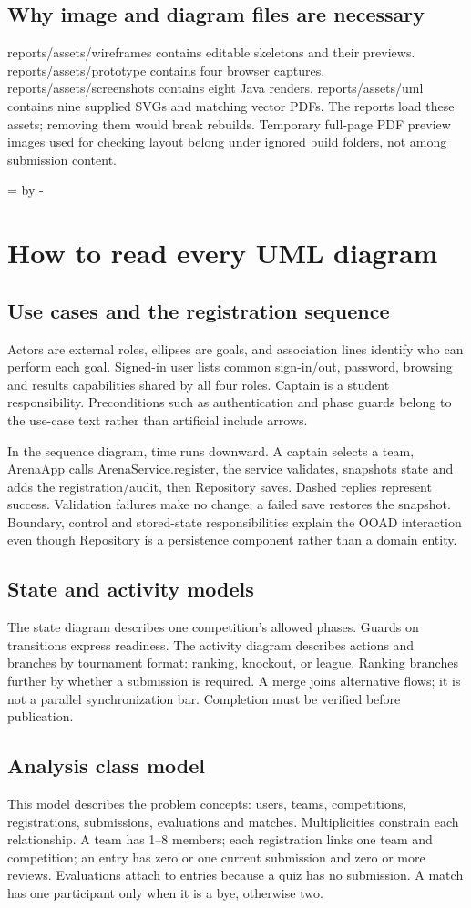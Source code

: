 \documentclass[12pt]{article}
\newcommand{\topic}[1]{\needroom{9\baselineskip}\section{#1}}
\newcommand{\needroom}[1]{\par\begingroup\dimen0=\pagegoal\advance\dimen0 by -\pagetotal\ifdim\dimen0<#1\newpage\fi\endgroup}
\begin{document}
\subsection{Why image and diagram files are necessary}
reports/assets/wireframes contains editable skeletons and their previews. reports/assets/prototype contains four browser captures. reports/assets/screenshots contains eight Java renders. reports/assets/uml contains nine supplied SVGs and matching vector PDFs. The reports load these assets; removing them would break rebuilds. Temporary full-page PDF preview images used for checking layout belong under ignored build folders, not among submission content.

\topic{How to read every UML diagram}
\subsection{Use cases and the registration sequence}
Actors are external roles, ellipses are goals, and association lines identify who can perform each goal. Signed-in user lists common sign-in/out, password, browsing and results capabilities shared by all four roles. Captain is a student responsibility. Preconditions such as authentication and phase guards belong to the use-case text rather than artificial include arrows.

In the sequence diagram, time runs downward. A captain selects a team, ArenaApp calls ArenaService.register, the service validates, snapshots state and adds the registration/audit, then Repository saves. Dashed replies represent success. Validation failures make no change; a failed save restores the snapshot. Boundary, control and stored-state responsibilities explain the OOAD interaction even though Repository is a persistence component rather than a domain entity.
\subsection{State and activity models}
The state diagram describes one competition's allowed phases. Guards on transitions express readiness. The activity diagram describes actions and branches by tournament format: ranking, knockout, or league. Ranking branches further by whether a submission is required. A merge joins alternative flows; it is not a parallel synchronization bar. Completion must be verified before publication.
\subsection{Analysis class model}
This model describes the problem concepts: users, teams, competitions, registrations, submissions, evaluations and matches. Multiplicities constrain each relationship. A team has 1--8 members; each registration links one team and competition; an entry has zero or one current submission and zero or more reviews. Evaluations attach to entries because a quiz has no submission. A match has one participant only when it is a bye, otherwise two.
\end{document}
